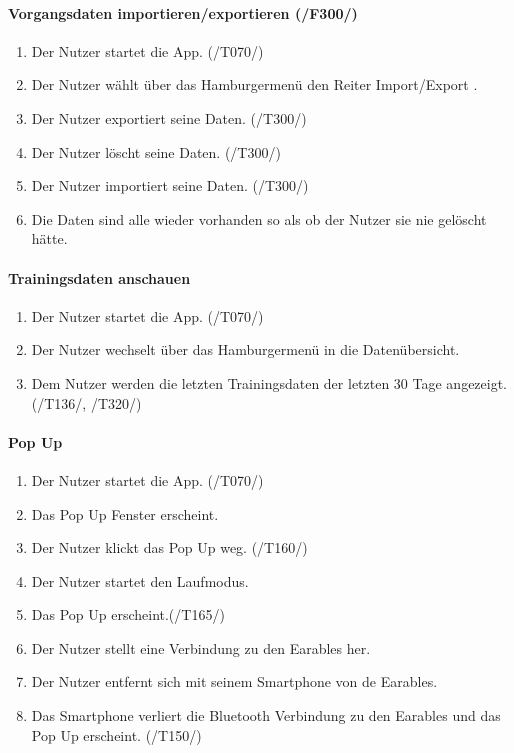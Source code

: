 \documentclass[a4paper,12pt]{article}
\begin{document}
      \paragraph{Vorgangsdaten importieren/exportieren (/F300/)}
      \begin{enumerate}
        \item Der Nutzer startet die App. (/T070/)
        \item Der Nutzer wählt über das Hamburgermenü den Reiter \glqq{}Import/Export \grqq{}.
        \item Der Nutzer exportiert seine Daten. (/T300/)
        \item Der Nutzer löscht seine Daten. (/T300/)
        \item Der Nutzer importiert seine Daten. (/T300/)
        \item Die Daten sind alle wieder vorhanden so als ob der Nutzer sie nie gelöscht hätte.
      \end{enumerate}

    \paragraph{Trainingsdaten anschauen}
    \begin{enumerate}
	\item Der Nutzer startet die App. (/T070/)
 	\item Der Nutzer wechselt über das Hamburgermenü in die Datenübersicht.
	\item Dem Nutzer werden die letzten Trainingsdaten der letzten 30 Tage angezeigt. (/T136/, /T320/)
    \end{enumerate}

    \paragraph{Pop Up}
    \begin{enumerate}
	\item Der Nutzer startet die App. (/T070/)
 	\item Das Pop Up Fenster erscheint.
 	\item Der Nutzer klickt das Pop Up weg. (/T160/)
 	\item Der Nutzer startet den Laufmodus.
 	\item Das Pop Up erscheint.(/T165/)
 	\item Der Nutzer stellt eine Verbindung zu den \gls{Earables} her.
 	\item Der Nutzer entfernt sich mit seinem Smartphone von de \gls{Earables}.
 	\item Das Smartphone verliert die Bluetooth Verbindung zu den \gls{Earables} und das Pop Up erscheint. (/T150/)
    \end{enumerate}
\end{document}

